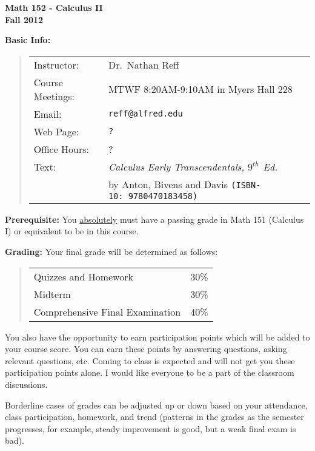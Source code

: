 \documentclass[12pt]{article}
\begin{document}
\begin{center}
{\Large \bf Math 152 - Calculus II}\\
{\bf Fall 2012}
\end{center}


{\bf Basic Info:}
\begin{quote}
\begin{tabular}{ll}
Instructor:& Dr.\ Nathan Reff\\
Course Meetings:& MTWF 8:20AM-9:10AM in Myers Hall 228\\
Email:&{\tt reff@alfred.edu}\\
Web Page:&{\tt ?}\\
Office Hours: & ?\\
Text:&{\it Calculus Early Transcendentals, $9^{th}$ Ed.}\\
 & by Anton, Bivens and Davis \texttt{\scriptsize (ISBN-10:\ 9780470183458)} 
\end{tabular}
\end{quote}


{\bf Prerequisite:} You \underline{absolutely} must have a passing grade in Math 151 (Calculus I) or equivalent to be in this course.

{\bf Grading:}  Your final grade will be determined as follows:
\begin{quote}
\begin{center}
\begin{tabular}{lr}
Quizzes and Homework & 30\% \\
Midterm & 30\% \\
Comprehensive Final Examination & 40\% \\
\end{tabular}
\end{center}
\end{quote}

You also have the opportunity to earn participation points which will be added to your course score.  You can earn these points by answering questions, asking relevant questions, etc.  Coming to class is expected and will not get you these participation points alone.  I would like everyone to be a part of the classroom discussions.  

Borderline cases of grades can be adjusted up or down based on your attendance, class participation, homework, and trend (patterns in the grades as the semester progresses, for example, steady improvement is good, but a weak final exam is bad). 
\end{document}
